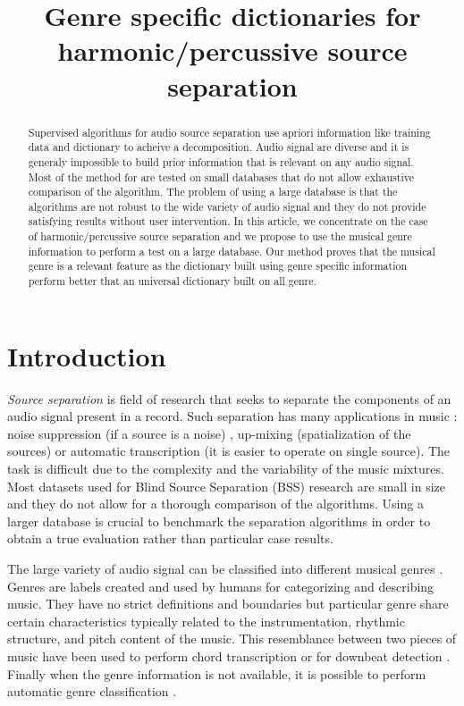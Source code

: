 \documentclass{article}
\title{Genre specific dictionaries for harmonic/percussive source separation}
\begin{document}
%
\maketitle
%
\begin{abstract}

Supervised algorithms for audio source separation use apriori information like training data and dictionary to acheive a decomposition. Audio signal are diverse and it is generaly impossible to build prior information that is relevant on any audio signal. Most of the method for are tested on small databases that do not allow exhaustive comparison of the algorithm. The problem of using a large database is that the algorithms are not robust to the wide variety of audio signal and they do not provide satisfying results without user intervention. In this article, we concentrate on the case of harmonic/percussive source separation and we propose to use the musical genre information to perform a test on a large database. Our method proves that the musical genre is a relevant feature as the dictionary built using genre specific information perform better that an universal dictionary built on all genre.  



\end{abstract}
%
\section{Introduction}\label{sec:introduction}


\emph{Source separation} is field of ​​research that seeks to separate the components of an audio signal present in a record. Such separation has many applications in music : noise suppression \cite{boll1979suppression} (if a source is a noise) , up-mixing \cite{fitzgerald2011upmixing}(spatialization of the sources) or automatic transcription \cite{Bertin07} (it is easier to operate on single source). The task is difficult due to the complexity and the variability of the music mixtures. Most datasets used for Blind Source Separation (BSS) research are small in size and they do not allow for a thorough comparison of the algorithms. Using a larger database is crucial to benchmark the separation algorithms in order to obtain a true evaluation rather than particular case results. 

The large variety of audio signal can be classified into different musical genres \cite{tzanetakis2002musical}. Genres are labels created and used by humans for categorizing and describing music. They have no strict definitions and boundaries but particular genre share certain characteristics typically related to the instrumentation, rhythmic structure, and pitch content of the music. This resemblance between two pieces of music have been used to perform chord transcription \cite{ni2012using,lee2008acoustic} or for downbeat detection \cite{hockman2012one}. Finally when the genre information is not available, it is possible to perform automatic genre classification \cite{li2003comparative}.
\end{document}
